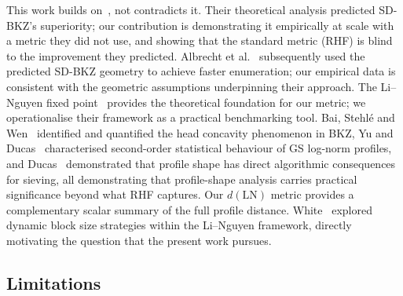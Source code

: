 \documentclass[journal=cic,version=preprint]{iacrj}
\begin{document}
This work builds on~\cite{EC:MicWal16}, not contradicts it. Their theoretical analysis predicted SD-BKZ's superiority; our contribution is demonstrating it empirically at scale with a metric they did not use, and showing that the standard metric (RHF) is blind to the improvement they predicted. Albrecht et al.~\cite{C:ABFKSW20} subsequently used the predicted SD-BKZ geometry to achieve faster enumeration; our empirical data is consistent with the geometric assumptions underpinning their approach. The Li--Nguyen fixed point~\cite{EPRINT:LiNgu20} provides the theoretical foundation for our metric; we operationalise their framework as a practical benchmarking tool. Bai, Stehl\'{e} and Wen~\cite{AC:BaiSteWen18} identified and quantified the head concavity phenomenon in BKZ, Yu and Ducas~\cite{SAC:YuDuc17} characterised second-order statistical behaviour of GS log-norm profiles, and Ducas~\cite{EC:Ducas18} demonstrated that profile shape has direct algorithmic consequences for sieving, all demonstrating that profile-shape analysis carries practical significance beyond what RHF captures. Our $d(\mathrm{LN})$ metric provides a complementary scalar summary of the full profile distance. White~\cite{White26} explored dynamic block size strategies within the Li--Nguyen framework, directly motivating the question that the present work pursues.

\subsection{Limitations}
\label{sec:limitations}
\end{document}
